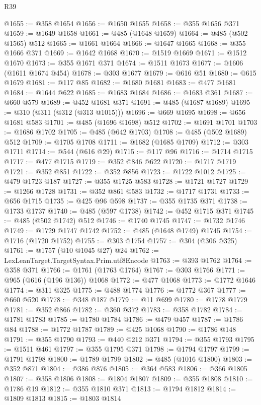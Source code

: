 \begin{lexlean}{R39}
\begin{coremodule}
@1655 := @358 @1654
@1656 := @1650 @1655
@1658 := @355 @1656 @371
@1659 := @1649 @1658
@1661 := @485 (@1648 @1659)
@1664 := @485 (@502 @1565) @512
@1665 := @1661 @1664
@1666 := @1647 @1665
@1668 := @355 @1666 @371
@1669 := @1642 @1668
@1670 := @1519 @1669
@1671 := @1512 @1670
@1673 := @355 @1671 @371
@1674 := @1511 @1673
@1677 := @1606 (@1611 @1674 @454)
@1678 := @303 @1677
@1679 := @616 @51
@1680 := @615 @1679
@1681 := @117 @85
@1682 := @1680 @1681
@1683 := @477 @1681
@1684 := @1644 @622
@1685 := @1683 @1684
@1686 := @1683 @361
@1687 := @660 @579
@1689 := @452 @1681 @371
@1691 := @485 (@1687 @1689)
@1695 := @310 (@311 (@312 (@313 @1015)))
@1696 := @669 @1695
@1698 := @656 @1681 @583
@1701 := @485 (@1696 @1698) @512
@1702 := @1691 @1701
@1703 := @1686 @1702
@1705 := @485 (@642 @1703)
@1708 := @485 (@502 @1689) @512
@1709 := @1705 @1708
@1711 := @1682 (@1685 @1709)
@1712 := @303 @1711
@1714 := @544 (@616 @29)
@1715 := @117 @96
@1716 := @1714 @1715
@1717 := @477 @1715
@1719 := @352 @846 @622
@1720 := @1717 @1719
@1721 := @352 @851
@1722 := @352 @856
@1723 := @1722 @1012
@1725 := @479 @1723 @187
@1727 := @355 @1725 @583
@1728 := @1721 @1727
@1729 := @1266 @1728
@1731 := @352 @861 @583
@1732 := @1717 @1731
@1733 := @656 @1715
@1735 := @425 @96 @598
@1737 := @355 @1735 @371
@1738 := @1733 @1737
@1740 := @485 (@597 @1738)
@1742 := @452 @1715 @371
@1745 := @485 (@502 @1742) @512
@1746 := @1740 @1745
@1747 := @1732 @1746
@1749 := @1729 @1747 @1742
@1752 := @485 (@1648 @1749) @1745
@1754 := @1716 (@1720 @1752)
@1755 := @303 @1754
@1757 := @304 (@306 @325)
@1761 := @1757 (@10 @1045 @27) @24
@1762 := LexLeanTarget.TargetSyntax.Prim.utf8Encode
@1763 := @393 @1762
@1764 := @358 @371
@1766 := @1761 (@1763 @1764)
@1767 := @303 @1766
@1771 := @965 (@616 (@196 @136)) @1068
@1772 := @477 @1068
@1773 := @1772 @1646
@1774 := @311 @325
@1775 := @488 @1774
@1776 := @1772 @367
@1777 := @660 @520
@1778 := @348 @187
@1779 := @11 @699
@1780 := @1778 @1779
@1781 := @352 @866
@1782 := @360 @372
@1783 := @358 @1782
@1784 := @1781 @1783
@1785 := @1780 @1784
@1786 := @479 @457
@1787 := @1786 @84
@1788 := @1772 @1787
@1789 := @425 @1068
@1790 := @1786 @148
@1791 := @355 @1790
@1793 := @440 @212 @371
@1794 := @355 @1793
@1795 := @1511 @461
@1797 := @355 @1795 @371
@1798 := @1794 @1797
@1799 := @1791 @1798
@1800 := @1789 @1799
@1802 := @485 (@1016 @1800)
@1803 := @352 @871
@1804 := @386 @876
@1805 := @364 @583
@1806 := @366 @1805
@1807 := @358 @1806
@1808 := @1804 @1807
@1809 := @355 @1808
@1810 := @1786 @19
@1812 := @355 @1810 @371
@1813 := @1794 @1812
@1814 := @1809 @1813
@1815 := @1803 @1814

\end{coremodule}
\end{lexlean}
